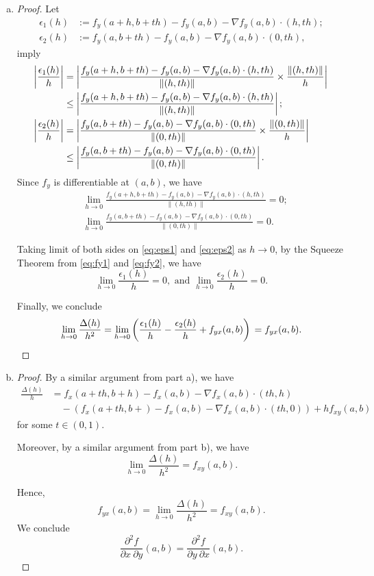 \begin{Exercise}
\begin{enumerate}[a)]
\item
\begin{proof}
Let 
\begin{align*}
\epsilon_1(h) &:= f_y(a+h,b+t h)-f_y(a,b)-\nabla f_y(a,b)\cdot(h,t h); \\
\epsilon_2(h) &:= f_y(a,b+t h)-f_y(a,b)-\nabla f_y(a,b)\cdot(0,t h),
\end{align*}
imply
\begin{align}
\left| \frac{\epsilon_1(h)}{h} \right| 
&= \left| \frac{f_y(a+h,b+t h)-f_y(a,b)-\nabla f_y(a,b)\cdot(h,t h)}{\| (h, t h) \|} \times \frac{\| (h, t h) \|}{h} \right| \notag \\
&\leq \left| \frac{f_y(a+h,b+t h)-f_y(a,b)-\nabla f_y(a,b)\cdot(h,t h)}{\| (h, t h) \|} \right|; \label{eq:eps1} \\
\left| \frac{\epsilon_2(h)}{h} \right|
&= \left| \frac{f_y(a,b+t h)-f_y(a,b)-\nabla f_y(a,b)\cdot(0,t h)}{\|(0,t h) \|} \times \frac{\|(0, t h) \|}{h} \right| \notag \\
&\leq\left| \frac{f_y(a,b+t h)-f_y(a,b)-\nabla f_y(a,b)\cdot(0,t h)}{\|(0,t h) \|} \right|. \label{eq:eps2}
\end{align}
Since $f_y$ is differentiable at $(a,b)$, we have
\begin{align}
&\lim_{h\to 0} \frac{f_y(a+h,b+t h)-f_y(a,b)-\nabla f_y(a,b)\cdot(h,t h)}{\| (h, t h) \|} = 0; \label{eq:fy1}\\
&\lim_{h\to 0} \frac{f_y(a,b+t h)-f_y(a,b)-\nabla f_y(a,b)\cdot(0,t h)}{\|(0,t h) \|} = 0.  \label{eq:fy2}
\end{align}

Taking limit of both sides on \eqref{eq:eps1} and \eqref{eq:eps2} as $h\to 0$, by the Squeeze Theorem from \eqref{eq:fy1} and \eqref{eq:fy2}, we have
$$
\lim_{h\to 0} \frac{\epsilon_1(h)}{h} = 0,\text{ and }\lim_{h\to 0} \frac{\epsilon_2(h)}{h} = 0.
$$

Finally, we conclude
$$
\lim_{h\to 0}\frac{\Delta(h)}{h^2}
= \lim_{h\to 0} \left( \frac{\epsilon_1(h)}{h}-\frac{\epsilon_2(h)}{h}+f_{y x}(a,b) \right) \\
= f_{y x}(a,b).
$$
\end{proof}

\item
\begin{proof}
By a similar argument from part a), we have
\begin{align*}
\frac{\Delta(h)}{h}
&= f_x(a+t h,b+h)-f_x(a,b)-\nabla f_x(a,b)\cdot(t h,h)\\
&\quad -\left( f_x(a+t h,b+)-f_x(a,b)-\nabla f_x(a,b)\cdot(t h,0) \right) + h f_{x y}(a,b)
\end{align*}
for some $t\in(0,1)$.

Moreover, by a similar argument from part b), we have
$$
\lim_{h\to 0}\frac{\Delta(h)}{h^2}
= f_{x y}(a,b).
$$

Hence, 
$$
f_{y x}(a,b) = \lim_{h\to 0}\frac{\Delta(h)}{h^2} = f_{x y}(a,b).
$$
We conclude
$$
\frac{\partial^2 f}{\partial x\ \partial y}(a,b)
= \frac{\partial^2 f}{\partial y\ \partial x}(a,b).
$$
\end{proof}
\end{enumerate}
\end{Exercise}